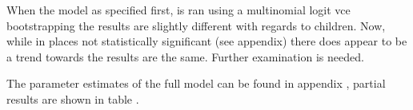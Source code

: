 \documentclass{article}
\begin{document}

When the model as specified first, is ran using a multinomial logit vce bootstrapping the results are slightly different with regards to children.  Now, while in places not statistically significant (see appendix) there does appear to be a trend towards the results are the same.  Further examination is needed.

The parameter estimates of the full model can be found in appendix 
, partial results are shown in table 
.
  
\end{document}

